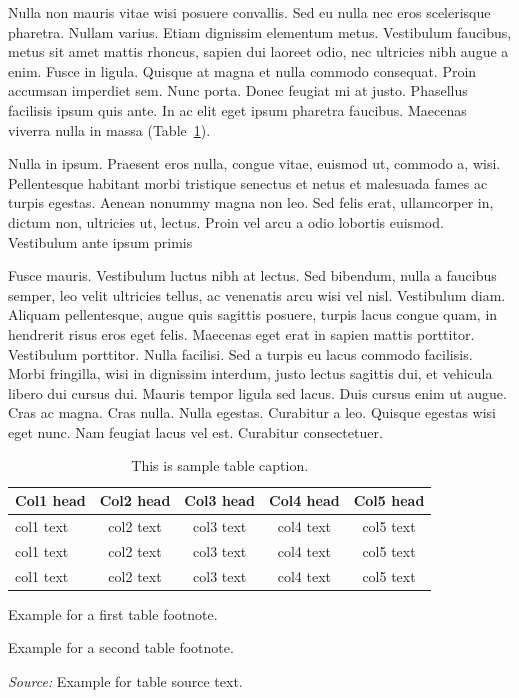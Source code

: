 \documentclass[ASNA,twocolumn]{USG} %
\begin{document}
{Nulla non mauris vitae wisi posuere convallis. Sed eu nulla nec eros scelerisque pharetra. Nullam varius. Etiam
dignissim elementum metus. Vestibulum faucibus, metus sit amet mattis rhoncus, sapien dui laoreet odio, nec ultricies
nibh augue a enim. Fusce in ligula. Quisque at magna et nulla commodo consequat. Proin accumsan imperdiet sem.
Nunc porta. Donec feugiat mi at justo. Phasellus facilisis ipsum quis ante. In ac elit eget ipsum pharetra faucibus.
Maecenas viverra nulla in massa (Table~\ref{tab2}).

Nulla in ipsum. Praesent eros nulla, congue vitae, euismod ut, commodo a, wisi. Pellentesque habitant morbi
tristique senectus et netus et malesuada fames ac turpis egestas. Aenean nonummy magna non leo. Sed felis erat,
ullamcorper in, dictum non, ultricies ut, lectus. Proin vel arcu a odio lobortis euismod. Vestibulum ante ipsum primis

Fusce mauris. Vestibulum luctus nibh at lectus. Sed bibendum, nulla a faucibus semper, leo velit ultricies tellus, ac
venenatis arcu wisi vel nisl. Vestibulum diam. Aliquam pellentesque, augue quis sagittis posuere, turpis lacus congue
quam, in hendrerit risus eros eget felis. Maecenas eget erat in sapien mattis porttitor. Vestibulum porttitor. Nulla
facilisi. Sed a turpis eu lacus commodo facilisis. Morbi fringilla, wisi in dignissim interdum, justo lectus sagittis dui, et
vehicula libero dui cursus dui. Mauris tempor ligula sed lacus. Duis cursus enim ut augue. Cras ac magna. Cras nulla.
Nulla egestas. Curabitur a leo. Quisque egestas wisi eget nunc. Nam feugiat lacus vel est. Curabitur consectetuer.

\begin{table}[!t]%
\centering %
\caption{This is sample table caption.\label{tab2}}%
\begin{tabular*}{\textwidth}{@{\extracolsep\fill}lcccc@{\extracolsep\fill}}
\toprule
\textbf{Col1 head} & \textbf{Col2 head}  & \textbf{Col3 head}  & \textbf{Col4 head}  & \textbf{Col5 head} \\
\midrule
col1 text & col2 text  & col3 text  & col4 text  & col5 text\tnote{$^\dagger$}   \\
col1 text & col2 text  & col3 text  & col4 text  & col5 text   \\
col1 text & col2 text  & col3 text  & col4 text  & col5 text\tnote{$^\ddagger$}   \\
\bottomrule
\end{tabular*}
\begin{tablenotes}
\item[$^\dagger$] Example for a first table footnote.
\item[$^\ddagger$] Example for a second table footnote.
\item {\it Source:} Example for table source text.
\end{tablenotes}
\end{table}

}
\end{document}
